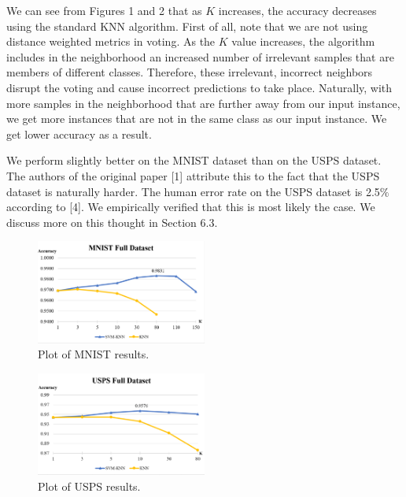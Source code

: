 \documentclass[11pt,letterpaper]{article}
\begin{document}
We can see from Figures 1 and 2 that as $K$ increases, the accuracy decreases using the standard KNN algorithm. First of all, note that we are not using distance weighted metrics in voting. As the $K$ value increases, the algorithm includes in the neighborhood an increased number of irrelevant samples that are members of different classes. Therefore, these irrelevant, incorrect neighbors disrupt the voting and cause incorrect predictions to take place. Naturally, with more samples in the neighborhood that are further away from our input instance, we get more instances that are not in the same class as our input instance. We get lower accuracy as a result.

We perform slightly better on the MNIST dataset than on the USPS dataset. The authors of the original paper [1] attribute this to the fact that the USPS dataset is naturally harder. The human error rate on the USPS dataset is 2.5$\%$ according to [4]. We empirically verified that this is most likely the case. We discuss more on this thought in Section 6.3.

\begin{figure}[t!]
  \centering
  \includegraphics[keepaspectratio, width=0.5\textwidth]{mnist_full.png}
  \caption{Plot of MNIST results.}
\end{figure}

\begin{figure}[t!]
  \centering
  \includegraphics[keepaspectratio, width=0.5\textwidth]{usps_full.png}
  \caption{Plot of USPS results.}
\end{figure}
\end{document}
